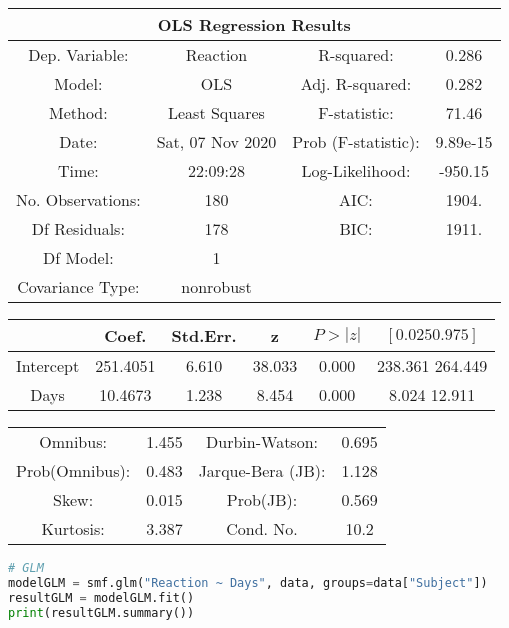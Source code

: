 \begin{center}
\begin{tabular}{ c c c c }
\multicolumn{4}{c}{OLS Regression Results} \\
\hline
\hline
Dep. Variable: & Reaction & R-squared: & 0.286\\
Model: & OLS & Adj. R-squared: & 0.282\\
Method: & Least Squares & F-statistic: & 71.46\\
Date: & Sat, 07 Nov 2020 & Prob (F-statistic): & 9.89e-15\\
Time: & 22:09:28 & Log-Likelihood: & -950.15\\
No. Observations: & 180 & AIC: & 1904.\\
Df Residuals: & 178 & BIC: & 1911.\\
Df Model: & 1 & & \\        
Covariance Type: & nonrobust & & \\
\hline
\hline
\end{tabular}
\begin{tabular}{ c c c c c c }
 & Coef. & Std.Err. & z & $P>|z|$  & $[0.025  0.975]$\\
\hline
Intercept & 251.4051 & 6.610 & 38.033 & 0.000 & 238.361  264.449\\
Days & 10.4673 & 1.238 & 8.454 & 0.000 & 8.024  12.911\\
\hline
\hline
\end{tabular}
\begin{tabular}{ c c c c }
Omnibus: & 1.455 & Durbin-Watson: & 0.695\\
Prob(Omnibus): & 0.483 & Jarque-Bera (JB): & 1.128\\
Skew: & 0.015 & Prob(JB): & 0.569\\
Kurtosis: & 3.387 & Cond. No. & 10.2\\
\hline
\hline
\end{tabular}
\end{center}


\begin{lstlisting}[language=Python]
# GLM
modelGLM = smf.glm("Reaction ~ Days", data, groups=data["Subject"])
resultGLM = modelGLM.fit()
print(resultGLM.summary())
\end{lstlisting}

